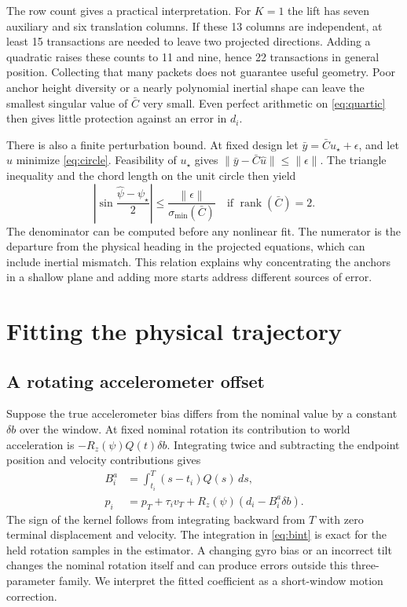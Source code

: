 \documentclass{IEEEtaes}
\newcommand{\rz}{R_z}
\newcommand{\norm}[1]{\left\lVert#1\right\rVert}
\begin{document}
The row count gives a practical interpretation. For \(K=1\) the lift has seven auxiliary and six translation columns. If these 13 columns are independent, at least 15 transactions are needed to leave two projected directions. Adding a quadratic raises these counts to 11 and nine, hence 22 transactions in general position. Collecting that many packets does not guarantee useful geometry. Poor anchor height diversity or a nearly polynomial inertial shape can leave the smallest singular value of \(\bar C\) very small. Even perfect arithmetic on \eqref{eq:quartic} then gives little protection against an error in \(d_i\).

There is also a finite perturbation bound. At fixed design let \(\bar y=\bar C u_\star+\epsilon\), and let \(\hat u\) minimize \eqref{eq:circle}. Feasibility of \(u_\star\) gives \(\|\bar y-\bar C\hat u\|\le\|\epsilon\|\). The triangle inequality and the chord length on the unit circle then yield
\begin{equation}
 \left|\sin\frac{\hat\psi-\psi_\star}{2}\right|
 \le \frac{\norm{\epsilon}}{\sigma_{\min}(\bar C)}
 \quad\text{if }\operatorname{rank}(\bar C)=2 .
 \label{eq:chord}
\end{equation}
The denominator can be computed before any nonlinear fit. The numerator is the departure from the physical heading in the projected equations, which can include inertial mismatch. This relation explains why concentrating the anchors in a shallow plane and adding more starts address different sources of error.

\section{Fitting the physical trajectory}\label{sec:fit}
\subsection{A rotating accelerometer offset}
Suppose the true accelerometer bias differs from the nominal value by a constant \(\delta b\) over the window. At fixed nominal rotation its contribution to world acceleration is \(-\rz(\psi)Q(t)\delta b\). Integrating twice and subtracting the endpoint position and velocity contributions gives
\begin{align}
 B_i^a &= \int_{t_i}^{T}(s-t_i)Q(s)\,ds,\label{eq:bint}\\
 p_i &=p_T+\tau_i v_T+\rz(\psi)(d_i-B_i^a\delta b).
 \label{eq:bias}
\end{align}
The sign of the kernel follows from integrating backward from \(T\) with zero terminal displacement and velocity. The integration in \eqref{eq:bint} is exact for the held rotation samples in the estimator. A changing gyro bias or an incorrect tilt changes the nominal rotation itself and can produce errors outside this three-parameter family. We interpret the fitted coefficient as a short-window motion correction.
\end{document}
